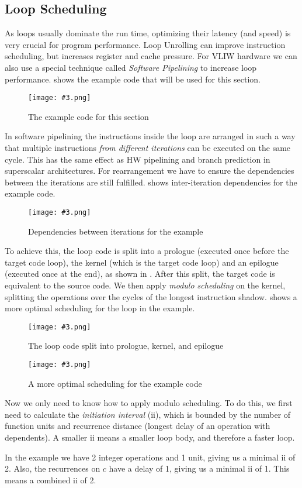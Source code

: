 \documentclass{article}
\newcommand{\fig}[4]{
	\begin{figure}[#1]
		\center
		\texttt{[image: \#3.png]}
		\caption{#4}
		\label{fig:#3}
	\end{figure}
	}
\begin{document}
\subsection{Loop Scheduling}
As loops usually dominate the run time, optimizing their latency (and speed) is very crucial for program performance.
Loop Unrolling can improve instruction scheduling, but increases register and cache pressure.
For VLIW hardware we can also use a special technique called \emph{Software Pipelining} to increase loop performance.
 shows the example code that will be used for this section.

\fig{h}{}{softpipeline}{The example code for this section}

In software pipelining the instructions inside the loop are arranged in such a way that multiple instructions \emph{from different iterations} can be executed on the same cycle.
This has the same effect as HW pipelining and branch prediction in superscalar architectures.
For rearrangement we have to ensure the dependencies between the iterations are still fulfilled.
 shows inter-iteration dependencies for the example code.

\fig{h}{0.8}{dependencies}{Dependencies between iterations for the example}

To achieve this, the loop code is split into a prologue (executed once before the target code loop), the kernel (which is the target code loop) and an epilogue (executed once at the end), as shown in .
After this split, the target code is equivalent to the source code.
We then apply \emph{modulo scheduling} on the kernel, splitting the operations over the cycles of the longest instruction shadow.
 shows a more optimal scheduling for the loop in the example.

\fig{h}{0.8}{split}{The loop code split into prologue, kernel, and epilogue}
\fig{h}{0.8}{scheduling}{A more optimal scheduling for the example code}

Now we only need to know how to apply modulo scheduling.
To do this, we first need to calculate the \emph{initiation interval} (ii), which is bounded by the number of function units and recurrence distance (longest delay of an operation with dependents).
A smaller ii means a smaller loop body, and therefore a faster loop.

In the example we have 2 integer operations and 1 unit, giving us a minimal ii of 2.
Also, the recurrences on $c$ have a delay of 1, giving us a minimal ii of 1.
This means a combined ii of 2.
\end{document}

